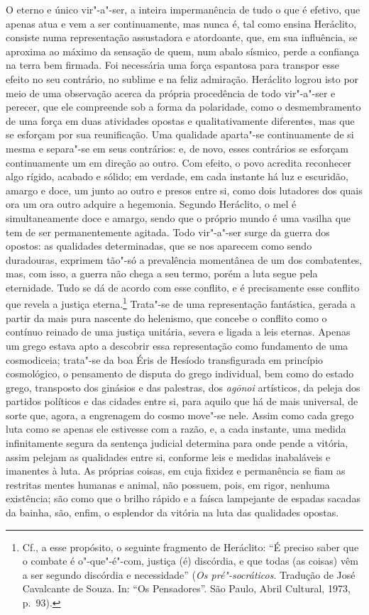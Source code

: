 O eterno e único vir"-a"-ser, a inteira impermanência de tudo o que é
efetivo, que apenas atua e vem a ser continuamente, mas nunca é, tal
como ensina Heráclito, consiste numa representação assustadora e
atordoante, que, em sua influência, se aproxima ao máximo da sensação de
quem, num abalo sísmico, perde a confiança na terra bem firmada. Foi \label{abalosismico}
necessária uma força espantosa para transpor esse efeito no seu
contrário, no sublime e na feliz admiração. Heráclito logrou
isto por meio de uma observação acerca da própria procedência de todo
vir"-a"-ser e perecer, que ele compreende sob a forma da polaridade, como
o desmembramento de uma força em duas atividades opostas e
qualitativamente diferentes, mas que se esforçam por sua reunificação.
Uma qualidade aparta"-se continuamente de si mesma e separa"-se em seus
contrários: e, de novo, esses contrários se esforçam continuamente
um em direção ao outro. Com efeito, o povo acredita reconhecer algo
rígido, acabado e sólido; em verdade, em cada instante há luz e
escuridão, amargo e doce, um junto ao outro e presos entre si, como
dois lutadores dos quais ora um ora outro adquire a hegemonia.
Segundo Heráclito, o mel é simultaneamente doce e amargo, sendo que o
próprio mundo é uma vasilha que tem de ser permanentemente
agitada. Todo vir"-a"-ser surge da guerra dos opostos: as qualidades \label{guerradosopostos}
determinadas, que se nos aparecem como sendo duradouras, exprimem
tão"-só a prevalência momentânea de um dos combatentes, 
mas, com isso, a
guerra não chega a seu termo, porém a luta segue pela eternidade.
Tudo se dá de acordo com esse conflito, e é precisamente esse conflito
que revela a justiça eterna.\footnote{ Cf., a esse propósito, o
seguinte fragmento de Heráclito: ``É preciso saber que o combate é
o"-que"-é"-com, justiça (é) discórdia, e que todas (as coisas) vêm a ser
segundo discórdia e necessidade'' (\textit{Os pré"-socráticos}. Tradução
de José Cavalcante de Souza. In: ``Os Pensadores''. São Paulo, Abril
Cultural, 1973, p.~93).} Trata"-se de uma representação
fantástica, gerada a partir da mais pura nascente do helenismo, que
concebe o conflito como o contínuo reinado de uma justiça unitária,
severa e ligada a leis eternas. Apenas um grego estava apto a descobrir
essa representação como fundamento de uma cosmodiceia; trata"-se da boa
Éris de Hesíodo transfigurada em princípio cosmológico, o pensamento de
disputa do grego individual, bem como do estado grego, transposto dos
ginásios e das palestras, dos \textit{ag\=onoi} artísticos, da peleja dos partidos
políticos e das cidades entre si, para aquilo que há de mais universal,
de sorte que, agora, a engrenagem do cosmo move"-se nele. Assim como cada
grego luta como se apenas ele estivesse com a razão, e, a cada
instante, uma medida infinitamente segura da sentença judicial
determina para onde pende a vitória, assim pelejam as qualidades entre
si, conforme leis e medidas inabaláveis e imanentes à luta. As próprias
coisas, em cuja fixidez e permanência se fiam as restritas mentes humanas e
animal, não possuem, pois, em rigor, nenhuma existência; são como que o
brilho rápido e a faísca lampejante de espadas sacadas da bainha, são,
enfim, o esplendor da vitória na luta das qualidades opostas.

